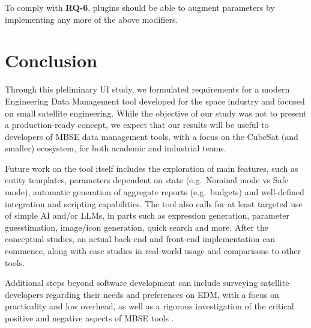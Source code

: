 \documentclass[]{iac}
\begin{document}
To comply with \textbf{RQ-6}, plugins should be able to augment parameters by implementing any more of the above modifiers.


\section{Conclusion}
\label{sec:conclusion}

Through this pleliminary \acl{UI} study, we formulated requirements for a modern Engineering Data Management tool developed for the space industry and focused on small satellite engineering. While the objective of our study was not to present a production-ready concept, we expect that our results will be useful to developers of \acs{MBSE} data management tools, with a focus on the CubeSat (and smaller) ecosystem, for both academic and industrial teams. 

Future work on the tool itself includes the exploration of main features, such as entity templates, parameters dependent on state (e.g.~Nominal mode vs Safe mode), automatic generation of aggregate reports (e.g.~budgets) and well-defined integration and scripting capabilities. The tool also calls for at least targeted use of simple \ac{AI} and/or \acp{LLM}, in parts such as expression generation, parameter guesstimation, image/icon generation, quick search and more. After the conceptual studies, an actual back-end and front-end implementation can commence, along with case studies in real-world usage and comparisons to other tools.

Additional steps beyond software development can include surveying satellite developers regarding their needs and preferences on \acs{EDM}, with a focus on practicality and low overhead, as well as a rigorous investigation of the critical positive and negative aspects of \acs{MBSE} tools \autocite{campo_model-based_2023,henderson_value_2021}.





\AtNextBibliography{\footnotesize}
\printbibliography
\end{document}
